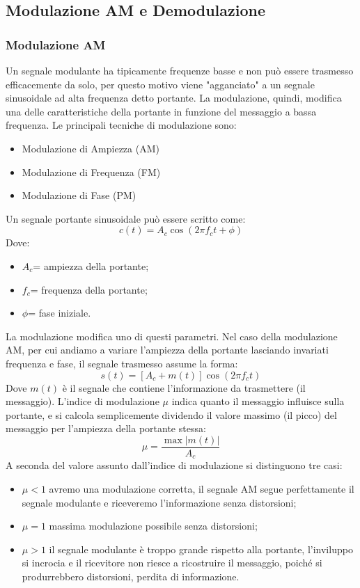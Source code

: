 \thispagestyle{plain}
\subsection{Modulazione AM e Demodulazione}
\subsubsection{Modulazione AM}
Un segnale modulante ha tipicamente frequenze basse e non può essere trasmesso efficacemente da solo, per questo motivo viene "agganciato" a un segnale sinusoidale ad alta frequenza detto portante. La modulazione, quindi, modifica una delle caratteristiche della portante in funzione del messaggio a bassa frequenza. Le principali tecniche di modulazione sono:
\begin{itemize}
  \item Modulazione di Ampiezza (AM)
  \item Modulazione di Frequenza (FM)
  \item Modulazione di Fase (PM)
\end{itemize}
Un segnale portante sinusoidale può essere scritto come:
\begin{equation}
c(t) = A_c \cos(2\pi f_c t + \phi)
\end{equation}
Dove:
\begin{itemize}
  \item $A_c$= ampiezza della portante;
  \item $f_c$= frequenza della portante;
  \item $\phi$= fase iniziale.
\end{itemize}
La modulazione modifica uno di questi parametri. Nel caso della modulazione AM, per cui andiamo a variare l'ampiezza della portante lasciando invariati frequenza e fase, il segnale trasmesso assume la forma:
\begin{equation}
  s(t) = \left[A_c + m(t)\right] \cos(2\pi f_c t)
\end{equation}
Dove $m(t)$ è il segnale che contiene l'informazione da trasmettere (il messaggio). L'indice di modulazione $\mu$ indica quanto il messaggio influisce sulla portante, e si calcola semplicemente dividendo il valore massimo (il picco) del messaggio per l'ampiezza della portante stessa:
\begin{equation}
\mu = \frac{\max |m(t)|}{A_c}
\end{equation}
A seconda del valore assunto dall'indice di modulazione si distinguono tre casi:
\begin{itemize}
  \item $\mu<1$ avremo una modulazione corretta, il segnale AM segue perfettamente il segnale modulante e riceveremo l'informazione senza distorsioni;
  \item $\mu=1$ massima modulazione possibile senza distorsioni;
  \item $\mu>1$ il segnale modulante è troppo grande rispetto alla portante, l'inviluppo si incrocia e il ricevitore non riesce a ricostruire il messaggio, poiché si produrrebbero distorsioni, perdita di informazione.
\end{itemize}

